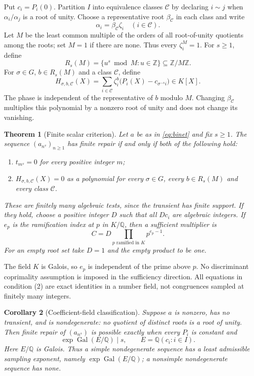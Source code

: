 \documentclass[11pt]{article}
\newtheorem{theorem}{Theorem}
\newtheorem{corollary}[theorem]{Corollary}
\theoremstyle{definition}
\theoremstyle{remark}
\newcommand{\Q}{\mathbb Q}
\newcommand{\Z}{\mathbb Z}
\newcommand{\Gal}{\operatorname{Gal}}
\begin{document}
Put $c_i=P_i(0)$. Partition $I$ into equivalence classes $\mathcal C$ by declaring $i\sim j$ when $\alpha_i/\alpha_j$ is a root of unity. Choose a representative root $\beta_{\mathcal C}$ in each class and write
\[
 \alpha_i=\beta_{\mathcal C}\zeta_i\quad(i\in\mathcal C).
\]
Let $M$ be the least common multiple of the orders of all root-of-unity quotients among the roots; set $M=1$ if there are none. Thus every $\zeta_i^M=1$. For $s\geq1$, define
\[
 R_s(M)=\{u^s\bmod M:u\in\Z\}\subseteq\Z/M\Z.
\]
For $\sigma\in G$, $b\in R_s(M)$ and a class $\mathcal C$, define
\begin{equation}\label{eq:polynomial}
 H_{\sigma,b,\mathcal C}(X)
 =\sum_{i\in\mathcal C}\zeta_i^b
       \bigl(P_i(X)-c_{\sigma^{-s}i}\bigr)\in K[X].
\end{equation}
The phase is independent of the representative of $b$ modulo $M$. Changing $\beta_{\mathcal C}$ multiplies this polynomial by a nonzero root of unity and does not change its vanishing.

\begin{theorem}[Finite scalar criterion]\label{thm:general}
Let $a$ be as in \eqref{eq:binet} and fix $s\geq1$. The sequence $(a_{n^s})_{n\geq1}$ has finite repair if and only if both of the following hold:
\begin{enumerate}
\item $t_{m^s}=0$ for every positive integer $m$;
\item $H_{\sigma,b,\mathcal C}(X)=0$ as a polynomial for every $\sigma\in G$, every $b\in R_s(M)$ and every class $\mathcal C$.
\end{enumerate}
These are finitely many algebraic tests, since the transient has finite support. If they hold, choose a positive integer $D$ such that all $Dc_i$ are algebraic integers. If $e_p$ is the ramification index at $p$ in $K/\Q$, then a sufficient multiplier is
\begin{equation}\label{eq:multiplier}
 C=D\prod_{p\text{ ramified in }K}p^{e_p-1}.
\end{equation}
For an empty root set take $D=1$ and the empty product to be one.
\end{theorem}

The field $K$ is Galois, so $e_p$ is independent of the prime above $p$. No discriminant coprimality assumption is imposed in the sufficiency direction. All equations in condition (2) are exact identities in a number field, not congruences sampled at finitely many integers.

\begin{corollary}[Coefficient-field classification]\label{cor:nondegenerate}
Suppose $a$ is nonzero, has no transient, and is nondegenerate: no quotient of distinct roots is a root of unity. Then finite repair of $(a_{n^s})$ is possible exactly when every $P_i$ is constant and
\begin{equation}\label{eq:coefficientfield}
 \exp\Gal(E/\Q)\mid s,
 \qquad E=\Q(c_i:i\in I).
\end{equation}
Here $E/\Q$ is Galois. Thus a simple nondegenerate sequence has a least admissible sampling exponent, namely $\exp\Gal(E/\Q)$; a nonsimple nondegenerate sequence has none.
\end{corollary}
\end{document}
